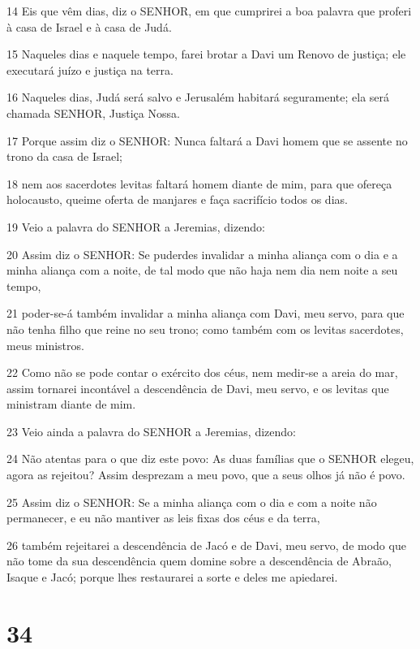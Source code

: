 \par 14 Eis que vêm dias, diz o SENHOR, em que cumprirei a boa palavra que proferi à casa de Israel e à casa de Judá.
\par 15 Naqueles dias e naquele tempo, farei brotar a Davi um Renovo de justiça; ele executará juízo e justiça na terra.
\par 16 Naqueles dias, Judá será salvo e Jerusalém habitará seguramente; ela será chamada SENHOR, Justiça Nossa.
\par 17 Porque assim diz o SENHOR: Nunca faltará a Davi homem que se assente no trono da casa de Israel;
\par 18 nem aos sacerdotes levitas faltará homem diante de mim, para que ofereça holocausto, queime oferta de manjares e faça sacrifício todos os dias.
\par 19 Veio a palavra do SENHOR a Jeremias, dizendo:
\par 20 Assim diz o SENHOR: Se puderdes invalidar a minha aliança com o dia e a minha aliança com a noite, de tal modo que não haja nem dia nem noite a seu tempo,
\par 21 poder-se-á também invalidar a minha aliança com Davi, meu servo, para que não tenha filho que reine no seu trono; como também com os levitas sacerdotes, meus ministros.
\par 22 Como não se pode contar o exército dos céus, nem medir-se a areia do mar, assim tornarei incontável a descendência de Davi, meu servo, e os levitas que ministram diante de mim.
\par 23 Veio ainda a palavra do SENHOR a Jeremias, dizendo:
\par 24 Não atentas para o que diz este povo: As duas famílias que o SENHOR elegeu, agora as rejeitou? Assim desprezam a meu povo, que a seus olhos já não é povo.
\par 25 Assim diz o SENHOR: Se a minha aliança com o dia e com a noite não permanecer, e eu não mantiver as leis fixas dos céus e da terra,
\par 26 também rejeitarei a descendência de Jacó e de Davi, meu servo, de modo que não tome da sua descendência quem domine sobre a descendência de Abraão, Isaque e Jacó; porque lhes restaurarei a sorte e deles me apiedarei.

\chapter{34}

